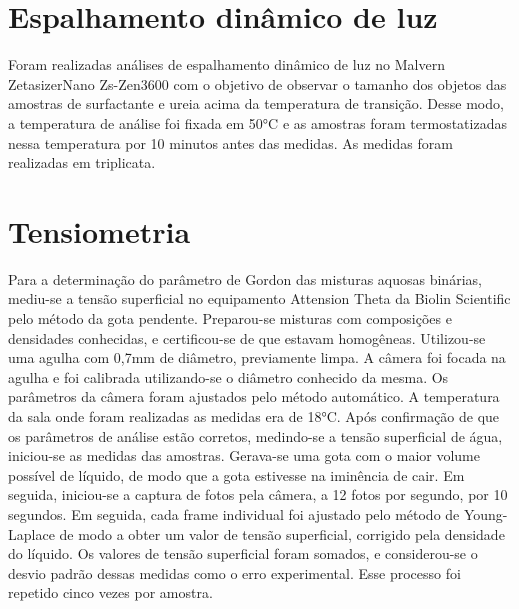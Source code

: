 		\section{Espalhamento dinâmico de luz}
		
		Foram realizadas análises de espalhamento dinâmico de luz no Malvern ZetasizerNano Zs-Zen3600 com o objetivo de observar o tamanho dos objetos das amostras de surfactante e ureia acima da temperatura de transição. Desse modo, a temperatura de análise foi fixada em 50°C e as amostras foram termostatizadas nessa temperatura por 10 minutos antes das medidas. As medidas foram realizadas em triplicata.
		
		\section{Tensiometria}
		
		Para a determinação do parâmetro de Gordon das misturas aquosas binárias, mediu-se a tensão superficial no equipamento Attension Theta da Biolin Scientific pelo método da gota pendente. Preparou-se misturas com composições e densidades conhecidas, e certificou-se de que estavam homogêneas. Utilizou-se uma agulha com 0,7mm de diâmetro, previamente limpa. A câmera foi focada na agulha e foi calibrada utilizando-se o diâmetro conhecido da mesma. Os parâmetros da câmera foram ajustados pelo método automático. A temperatura da sala onde foram realizadas as medidas era de 18°C. Após confirmação de que os parâmetros de análise estão corretos, medindo-se a tensão superficial de água, iniciou-se as medidas das amostras. Gerava-se uma gota com o maior volume possível de líquido, de modo que a gota estivesse na iminência de cair. Em seguida, iniciou-se a captura de fotos pela câmera, a 12 fotos por segundo, por 10 segundos. Em seguida, cada frame individual foi ajustado pelo método de Young-Laplace de modo a obter um valor de tensão superficial, corrigido pela densidade do líquido. Os valores de tensão superficial foram somados, e considerou-se o desvio padrão dessas medidas como o erro experimental. Esse processo foi repetido cinco vezes por amostra.